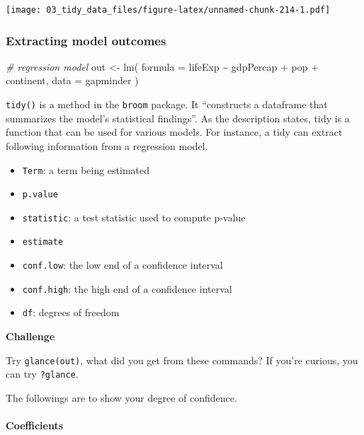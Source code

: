 \documentclass[
]{book}
\newenvironment{Shaded}{\begin{snugshade}}{\end{snugshade}}
\newcommand{\AttributeTok}[1]{\textcolor[rgb]{0.77,0.63,0.00}{#1}}
\newcommand{\CommentTok}[1]{\textcolor[rgb]{0.56,0.35,0.01}{\textit{#1}}}
\newcommand{\FunctionTok}[1]{\textcolor[rgb]{0.00,0.00,0.00}{#1}}
\newcommand{\NormalTok}[1]{#1}
\newcommand{\OtherTok}[1]{\textcolor[rgb]{0.56,0.35,0.01}{#1}}
\newcommand{\SpecialCharTok}[1]{\textcolor[rgb]{0.00,0.00,0.00}{#1}}
\providecommand{\tightlist}{%
  \setlength{\itemsep}{0pt}\setlength{\parskip}{0pt}}
\begin{document}
\texttt{[image: 03\_tidy\_data\_files/figure-latex/unnamed-chunk-214-1.pdf]}

\hypertarget{extracting-model-outcomes}{%
\subsubsection{Extracting model outcomes}\label{extracting-model-outcomes}}

\begin{Shaded}
\begin{Highlighting}[]
\CommentTok{\# regression model}
\NormalTok{out }\OtherTok{\textless{}{-}} \FunctionTok{lm}\NormalTok{(}
  \AttributeTok{formula =}\NormalTok{ lifeExp }\SpecialCharTok{\textasciitilde{}}\NormalTok{ gdpPercap }\SpecialCharTok{+}\NormalTok{ pop }\SpecialCharTok{+}\NormalTok{ continent,}
  \AttributeTok{data =}\NormalTok{ gapminder}
\NormalTok{)}
\end{Highlighting}
\end{Shaded}

\texttt{tidy()} is a method in the \texttt{broom} package. It ``constructs a dataframe that summarizes the model's statistical findings''. As the description states, tidy is a function that can be used for various models. For instance, a tidy can extract following information from a regression model.

\begin{itemize}
\tightlist
\item
  \texttt{Term}: a term being estimated
\item
  \texttt{p.value}
\item
  \texttt{statistic}: a test statistic used to compute p-value
\item
  \texttt{estimate}
\item
  \texttt{conf.low}: the low end of a confidence interval
\item
  \texttt{conf.high}: the high end of a confidence interval
\item
  \texttt{df}: degrees of freedom
\end{itemize}

\textbf{Challenge}

Try \texttt{glance(out)}, what did you get from these commands? If you're curious, you can try \texttt{?glance}.

The followings are to show your degree of confidence.

\hypertarget{coefficients}{%
\paragraph{Coefficients}\label{coefficients}}
\end{document}
